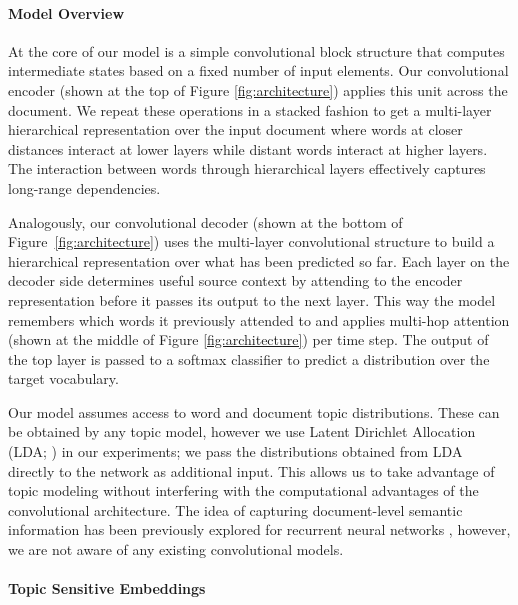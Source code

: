 \documentclass[11pt,a4paper]{article}
\begin{document}
\paragraph{Model Overview}

At the core of our model is a simple convolutional block structure
that computes intermediate states based on a fixed number of input
elements. Our convolutional encoder (shown at the top of Figure
\ref{fig:architecture}) applies this unit across the document. We
repeat these operations in a stacked fashion to get a multi-layer
hierarchical representation over the input document where words at
closer distances interact at lower layers while distant words interact
at higher layers. The interaction between words through hierarchical
layers effectively captures long-range dependencies. 


Analogously, our convolutional decoder (shown at the bottom of
Figure~\ref{fig:architecture}) uses the multi-layer convolutional
structure to build a hierarchical representation over what has been
predicted so far. Each layer on the decoder side determines useful
source context by attending to the encoder representation before it
passes its output to the next layer. This way the model remembers
which words it previously attended to and applies multi-hop attention
(shown at the middle of Figure \ref{fig:architecture}) per time
step. The output of the top layer is passed to a softmax classifier to
predict a distribution over the target vocabulary.


Our model assumes access to word and document topic
distributions. These can be obtained by any topic model, however we
use Latent Dirichlet Allocation (LDA; \citealt{Blei:2003:LDA}) in our
experiments; we pass the distributions obtained from LDA directly to
the network as additional input. This allows us to take advantage of
topic modeling without interfering with the computational advantages
of the convolutional architecture. The idea of capturing
document-level semantic information has been previously explored for
recurrent neural networks
\cite{mikolovZ12,Ghosh2016ContextualL,dieng-iclr17}, however, we are
not aware of any existing convolutional models.


\paragraph{Topic Sensitive Embeddings}
\end{document}
